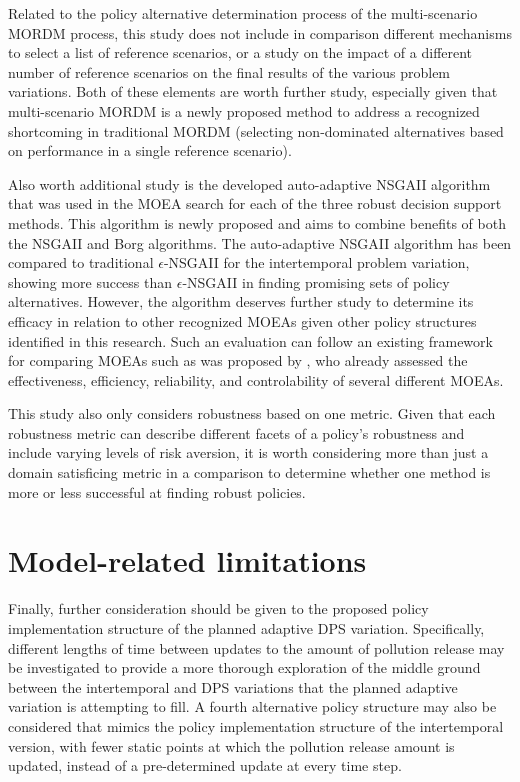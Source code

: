 Related to the policy alternative determination process of the multi-scenario MORDM process, this study does not include in comparison different mechanisms to select a list of reference scenarios, or a study on the impact of a different number of reference scenarios on the final results of the various problem variations. Both of these elements are worth further study, especially given that multi-scenario MORDM is a newly proposed method to address a recognized shortcoming in traditional MORDM (selecting non-dominated alternatives based on performance in a single reference scenario). 

Also worth additional study is the developed auto-adaptive NSGAII algorithm that was used in the MOEA search for each of the three robust decision support methods. This algorithm is newly proposed and aims to combine benefits of both the NSGAII and Borg algorithms. The auto-adaptive NSGAII algorithm has been compared to traditional $\epsilon$-NSGAII for the intertemporal problem variation, showing more success than $\epsilon$-NSGAII in finding promising sets of policy alternatives. However, the algorithm deserves further study to determine its efficacy in relation to other recognized MOEAs given other policy structures identified in this research. Such an evaluation can follow an existing framework for comparing MOEAs such as was proposed by \citet{Reed2013}, who already assessed the effectiveness, efficiency, reliability, and controlability of several different MOEAs. 

This study also only considers robustness based on one metric. Given that each robustness metric can describe different facets of a policy's robustness and include varying levels of risk aversion, it is worth considering more than just a domain satisficing metric in a comparison to determine whether one method is more or less successful at finding robust policies. 

\section{Model-related limitations}
Finally, further consideration should be given to the proposed policy implementation structure of the planned adaptive DPS variation. Specifically, different lengths of time between updates to the amount of pollution release may be investigated to provide a more thorough exploration of the middle ground between the intertemporal and DPS variations that the planned adaptive variation is attempting to fill. A fourth alternative policy structure may also be considered that mimics the policy implementation structure of the intertemporal version, with fewer static points at which the pollution release amount is updated, instead of a pre-determined update at every time step.
